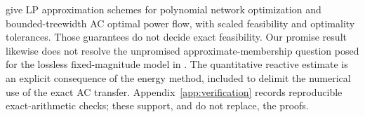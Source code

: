 \citet[Theorem 7 and Corollary 8 of the arXiv version]{BienstockMunoz2018}
give LP approximation schemes for polynomial network optimization and
bounded-treewidth AC optimal power flow, with scaled feasibility and
optimality tolerances. Those guarantees do not decide exact feasibility.
Our promise result likewise does not resolve the unpromised
approximate-membership question posed for the lossless fixed-magnitude
model in \citet[Section 1.3]{BienstockVermaPreprint2019}.
The quantitative reactive estimate is an explicit consequence of the
energy method, included to delimit the numerical use of the exact AC
transfer. Appendix~\ref{app:verification} records reproducible
exact-arithmetic checks; these support, and do not replace, the proofs.
